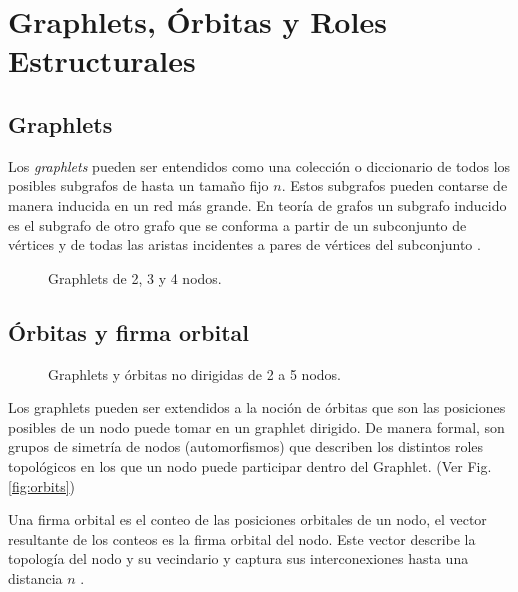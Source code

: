 
\chapter{Graphlets, Órbitas y Roles Estructurales}
\label{chapter:graphlets}

\section{Graphlets}


Los \textit{graphlets} pueden ser entendidos como una colección o diccionario de todos los posibles subgrafos de hasta un tamaño fijo $n$. Estos subgrafos pueden contarse de manera inducida en un red más grande. En teoría de grafos un subgrafo inducido es el subgrafo de otro grafo que se conforma a partir de un subconjunto de vértices y de todas las aristas incidentes a pares de vértices del subconjunto \cite{przulj_biological_2007}.


 \begin{figure}[htbp]
   \centering
   
    \caption{Graphlets de 2, 3 y 4 nodos.}
    \label{fig:small-graphlets}
\end{figure}

\section{Órbitas y firma orbital}

 \begin{figure}[htbp]
   \centering
   
    \caption{Graphlets y órbitas no dirigidas de 2 a 5 nodos.}
    \label{fig:orcaorbits}
\end{figure}

Los graphlets pueden ser extendidos a la noción de órbitas que son las posiciones posibles de un nodo puede tomar en un graphlet dirigido. De manera formal, son grupos de simetría de nodos (automorfismos) \cite{sarajlic_graphlet-based_2016} que describen los distintos roles topológicos en los que un nodo puede participar dentro del Graphlet. (Ver Fig. \ref{fig:orbits})

Una firma orbital es el conteo de las posiciones orbitales de un nodo, el vector resultante de los conteos es la firma orbital del nodo. Este vector describe la topología del nodo y su vecindario y captura sus interconexiones hasta una distancia $n$ \cite{sarajlic_graphlet-based_2016}.

